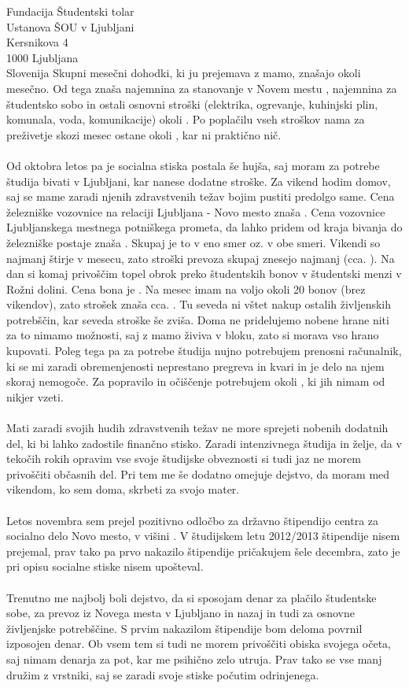 \documentclass[a4paper]{scrlttr2}
\begin{document}
\begin{letter}{Fundacija Študentski tolar \\ Ustanova ŠOU v Ljubljani \\ Kersnikova 4 \\ 1000 Ljubljana \\ Slovenija}
Skupni mesečni dohodki, ki ju prejemava z mamo, znašajo okoli  mesečno. Od tega znaša najemnina za stanovanje v Novem mestu , najemnina za študentsko sobo  in ostali osnovni stroški (elektrika, ogrevanje, kuhinjski plin, komunala, voda, komunikacije) okoli . 
Po poplačilu vseh stroškov nama za preživetje skozi mesec ostane okoli , kar ni praktično nič.
\\
\\
Od oktobra letos pa je socialna stiska postala še hujša, saj moram za potrebe študija bivati v Ljubljani, kar nanese dodatne stroške. Za vikend hodim domov, saj se mame zaradi njenih zdravstvenih težav bojim pustiti predolgo same. Cena železniške vozovnice na relaciji Ljubljana - Novo mesto znaša . Cena vozovnice Ljubljanskega mestnega potniškega prometa, da lahko pridem od kraja bivanja do železniške postaje znaša . Skupaj je to  v eno smer oz.  v obe smeri. Vikendi so najmanj štirje v mesecu, zato stroški prevoza skupaj znesejo najmanj  (cca. ). Na dan si komaj privoščim topel obrok preko študentskih bonov v študentski menzi v Rožni dolini. Cena bona je . Na mesec imam na voljo okoli 20 bonov (brez vikendov), zato strošek znaša cca. . Tu seveda ni vštet nakup ostalih življenskih potrebščin, kar seveda stroške še zviša. Doma ne pridelujemo nobene hrane niti za to nimamo možnosti, saj z mamo živiva v bloku, zato si morava vso hrano kupovati. Poleg tega pa za potrebe študija nujno potrebujem prenosni računalnik, ki se mi zaradi obremenjenosti neprestano pregreva in kvari in je delo na njem skoraj nemogoče. Za popravilo in očiščenje potrebujem okoli , ki jih nimam od nikjer vzeti. 
\\
\\
Mati zaradi svojih hudih zdravstvenih težav ne more sprejeti nobenih dodatnih del, ki bi lahko zadostile finančno stisko. Zaradi intenzivnega študija in želje, da v tekočih rokih opravim vse svoje študijske obveznosti si tudi jaz ne morem privoščiti občasnih del. Pri tem me še dodatno omejuje dejstvo, da moram med vikendom, ko sem doma, skrbeti za svojo mater.
\\
\\
Letos novembra sem prejel pozitivno odločbo za državno štipendijo centra za socialno delo Novo mesto, v višini . V študijskem letu 2012/2013 štipendije nisem prejemal, prav tako pa prvo nakazilo štipendije pričakujem šele decembra, zato je pri opisu socialne stiske nisem upošteval.
\\
\\
Trenutno me najbolj boli dejstvo, da si sposojam denar za plačilo študentske sobe, za prevoz iz Novega mesta v Ljubljano in nazaj in tudi za osnovne življenjske potrebščine. S prvim nakazilom štipendije bom deloma povrnil izposojen denar. Ob vsem tem si tudi ne morem privoščiti obiska svojega očeta, saj nimam denarja za pot, kar me psihično zelo utruja. Prav tako se vse manj družim z vrstniki, saj se zaradi svoje stiske počutim odrinjenega.


\end{letter}
\end{document}

